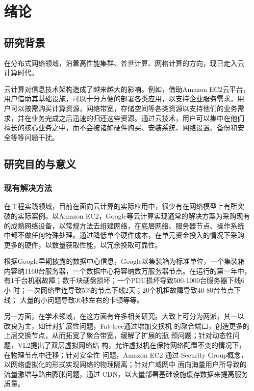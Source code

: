\documentclass[oneside, phd]{njuthesis}
\begin{document}
\chapter{绪论}\label{chapter_introduction}

\section{研究背景}

在分布式网络领域，沿着高性能集群、普世计算、网格计算的方向，现已走入云
计算时代。

云计算对信息技术架构造成了越来越大的影响。例如，借助Amazon EC2云平台，
用户借助其基础设施，可以十分方便的部署各类应用，以支持企业服务需求。用
户可以按需购买计算资源，网络带宽，存储空间等各类资源以支持他们的业务需
求，并在业务完成之后迅速的归还这些资源。通过云技术，用户可以集中在他们
擅长的核心业务之中，而不会被诸如硬件购买、安装系统、网络设置、备份和安
全等等问题干扰。

\section{研究目的与意义}

\subsection{现有解决方法}

在工程实践领域，目前在面向云计算的实际应用中，很少有在网络模型上有所突
破的实际案例。以Amazon EC2，Google等云计算实现通常的解决方案为采购现有
的成熟网络设备，以常规方法去组建网络，在底层网络、服务器节点、操作系统
中都不做任何特殊处理。通过降低单个硬件成本，在单元资金投入的情况下采购
更多的硬件，以数量获取性能，以冗余换取可靠性。

根据Google早期披露的数据中心信息，Google以集装箱为标准单位，一个集装箱
内容纳1160台服务器，一个数据中心将容纳数万服务器节点。在运行的第一年中，
有1千台机器故障；数千块硬盘损坏；一个PDU损坏导致500-1000台服务器下线6小
时；一次网络重连导致5\%的节点下线2天；20个机柜故障导致40-80台节点下线；
大量的小问题导致30秒左右的卡顿等等\cite{Dean2009}。

另一方面，在学术领域，在这方面有许多相关研究。大致上可分为两派，其一以
改良为主，如针对扩展性问题，Fat-tree\cite{al2008scalable}通过增加交换机
的聚合端口，创造更多的上层交换节点，从而拓宽了聚合带宽，缓解了扩展的瓶
颈问题；针对动态性问题，VL2\cite{greenberg2009vl2}提出了双层虚拟网络结
构，允许虚拟机在保持网络配置不变的情况下，在物理节点中迁移；针对安全性
问题，Amazon EC2\cite{varia2010architecting} \cite{hu2011review}通过
Security Group概念，以网络虚拟化的形式实现网络的物理隔离；针对广域网中
面向海量用户所导致的流量激增与路由膨胀问题，通过
CDN\cite{pallis2006insight}，以大量部署基础设施缓存数据来提高服务质量。
\end{document}
